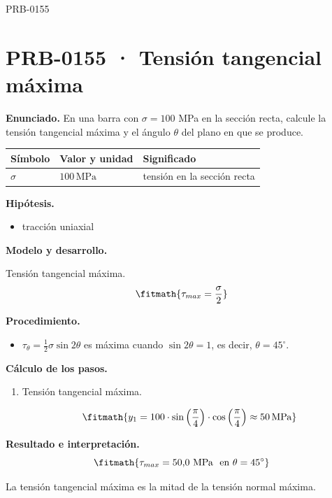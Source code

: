 \begin{studiumworked}{PRB-0155}

\section{PRB-0155 · Tensión tangencial máxima}

\textbf{Enunciado.} En una barra con $\sigma = 100$ MPa en la sección recta, calcule la tensión tangencial máxima y el ángulo $\theta$ del plano en que se produce.

\par\medskip\noindent\begin{tabular}{@{}p{.18\linewidth}p{.26\linewidth}p{.48\linewidth}@{}}
\toprule Símbolo & Valor y unidad & Significado\\\midrule
$\sigma$ & $100\,\mathrm{MPa}$ & tensión en la sección recta\\
\bottomrule\end{tabular}\par\medskip

\textbf{Hipótesis.}\begin{itemize}\item tracción uniaxial\end{itemize}

\textbf{Modelo y desarrollo.}

Tensión tangencial máxima.\[\fitmath{\tau_{max} = \frac{\sigma}{2}}\]

\textbf{Procedimiento.}\begin{itemize}\item $\tau_\theta = \tfrac12\sigma\sin 2\theta$ es máxima cuando $\sin 2\theta = 1$, es decir, $\theta = 45^{\circ}$.\end{itemize}

\textbf{Cálculo de los pasos.}

\begin{enumerate}

\item Tensión tangencial máxima.

\[\fitmath{y_{1}=100\cdot \sin\left(\frac{\pi}{4}\right)\cdot \cos\left(\frac{\pi}{4}\right)\approx 50\,\mathrm{MPa}}\]

\end{enumerate}

\textbf{Resultado e interpretación.}\[\fitmath{\tau_{max} = 50{,}0\ \mathrm{MPa}\ \text{ en }\theta = 45^{\circ}}\]

La tensión tangencial máxima es la mitad de la tensión normal máxima.


\end{studiumworked}
